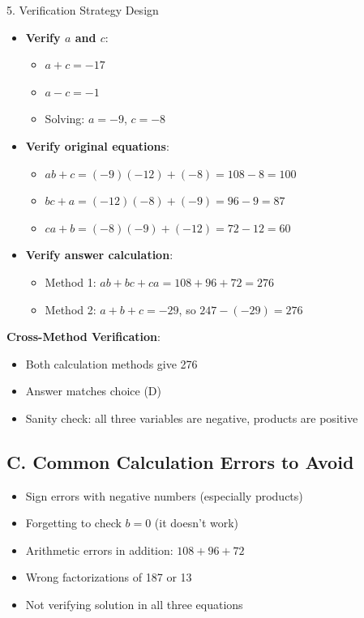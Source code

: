 \documentclass[12pt]{article}
\begin{document}
\begin{verificationbox}{5. Verification Strategy Design}
\begin{itemize}
    \item \textbf{Verify $a$ and $c$}:
    \begin{itemize}
        \item $a + c = -17$ \checkmark
        \item $a - c = -1$ \checkmark
        \item Solving: $a = -9$, $c = -8$ \checkmark
    \end{itemize}
    
    \item \textbf{Verify original equations}:
    \begin{itemize}
        \item $ab + c = (-9)(-12) + (-8) = 108 - 8 = 100$ \checkmark
        \item $bc + a = (-12)(-8) + (-9) = 96 - 9 = 87$ \checkmark
        \item $ca + b = (-8)(-9) + (-12) = 72 - 12 = 60$ \checkmark
    \end{itemize}
    
    \item \textbf{Verify answer calculation}:
    \begin{itemize}
        \item Method 1: $ab + bc + ca = 108 + 96 + 72 = 276$ \checkmark
        \item Method 2: $a+b+c = -29$, so $247 - (-29) = 276$ \checkmark
    \end{itemize}
\end{itemize}

\textbf{Cross-Method Verification}:
\begin{itemize}
    \item Both calculation methods give 276 \checkmark
    \item Answer matches choice (D) \checkmark
    \item Sanity check: all three variables are negative, products are positive \checkmark
\end{itemize}

\subsection*{C. Common Calculation Errors to Avoid}
\begin{itemize}[leftmargin=*]
    \item Sign errors with negative numbers (especially products)
    \item Forgetting to check $b = 0$ (it doesn't work)
    \item Arithmetic errors in addition: $108 + 96 + 72$
    \item Wrong factorizations of 187 or 13
    \item Not verifying solution in all three equations
\end{itemize}

\end{verificationbox}
\end{document}
